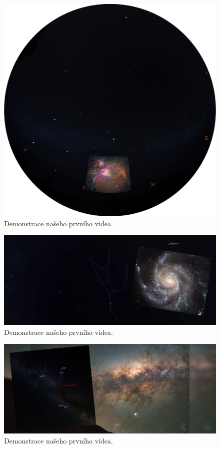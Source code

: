 \documentclass[12pt,a4paper,titlepage]{article}
\begin{document}
\begin{figure}[ht]
	\centering
	\includegraphics[width=.7\textwidth]{prosinec.eps}
	\caption{Demonstrace našeho prvního videa.}\label{img:prosinec}
\end{figure}

\begin{figure}[ht]
	\centering
	\includegraphics[width=.85\textwidth]{brezen.png}
	\caption{Demonstrace našeho prvního videa.}\label{img:brezen}
\end{figure}


\begin{figure}[ht]
	\centering
	\includegraphics[width=.85\textwidth]{cervenec.png}
	\caption{Demonstrace našeho prvního videa.}\label{img:cervenec}
\end{figure}
\end{document}
